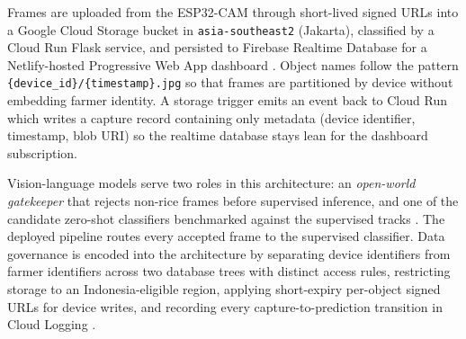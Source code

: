\documentclass[conference]{IEEEtran}
\begin{document}
Frames are uploaded from the ESP32-CAM through short-lived signed URLs into a Google Cloud Storage bucket in \texttt{asia-southeast2} (Jakarta), classified by a Cloud Run Flask service, and persisted to Firebase Realtime Database for a Netlify-hosted Progressive Web App dashboard \cite{b_elhattab,b_hercog}. Object names follow the pattern \texttt{\{device\_id\}/\{timestamp\}.jpg} so that frames are partitioned by device without embedding farmer identity. A storage trigger emits an event back to Cloud Run which writes a capture record containing only metadata (device identifier, timestamp, blob URI) so the realtime database stays lean for the dashboard subscription.

Vision-language models serve two roles in this architecture: an \textit{open-world gatekeeper} that rejects non-rice frames before supervised inference, and one of the candidate zero-shot classifiers benchmarked against the supervised tracks \cite{b_geng,b_zhang}. The deployed pipeline routes every accepted frame to the supervised classifier. Data governance is encoded into the architecture by separating device identifiers from farmer identifiers across two database trees with distinct access rules, restricting storage to an Indonesia-eligible region, applying short-expiry per-object signed URLs for device writes, and recording every capture-to-prediction transition in Cloud Logging \cite{b_pdp,b_pp71,b_uuite,b_iso30141}.
\end{document}
